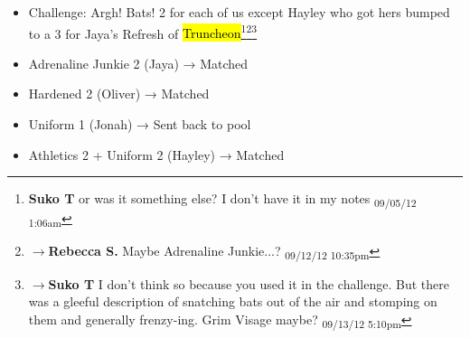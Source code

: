 
{
\parskip=0pt
\begin{itemize}
\item Challenge: Argh!  Bats! 2 for each of us except Hayley who got hers bumped to a 3 for Jaya's Refresh of \hl{Truncheon}\footnote{\textbf{Suko T }or was it something else?  I don't have it in my notes \textsubscript{09/05/12 1:06am}}\footnote{$\rightarrow$\textbf{Rebecca S. }Maybe Adrenaline Junkie...? \textsubscript{09/12/12 10:35pm}}\footnote{$\rightarrow$\textbf{Suko T }I don't think so because you used it in the challenge.  But there was a gleeful description of snatching bats out of the air and stomping on them and generally frenzy-ing.  Grim Visage maybe? \textsubscript{09/13/12 5:10pm}}
\end{itemize}

\begin{itemize}
\item Adrenaline Junkie 2 (Jaya) → Matched
\item Hardened 2 (Oliver) → Matched
\item Uniform 1 (Jonah) → Sent back to pool
\item Athletics 2 + Uniform 2 (Hayley) → Matched
\end{itemize}

}
